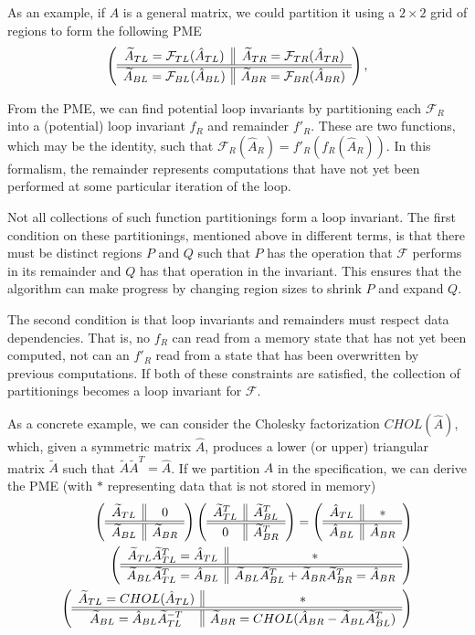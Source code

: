 \documentclass[12pt,letterpaper]{article}
\newcommand*{\opF}{\mathcal{F}}
\newcommand*{\opf}{f}
\begin{document}
As an example, if $A$ is a general matrix, we could partition it using a $2 \times 2$ grid of regions to form the following PME
\begin{equation*}
  \FlaTwoByTwo{\widetilde{A}_{TL} = \opF_{TL}(\hat{A}_{TL})}{\widetilde{A}_{TR} = \opF_{TR}(\hat{A}_{TR})}
  {\widetilde{A}_{BL} = \opF_{BL}(\hat{A}_{BL})}{\widetilde{A}_{BR} = \opF_{BR}(\hat{A}_{BR})},
\end{equation*}

From the PME, we can find potential loop invariants by partitioning each $\opF_R$ into a (potential) loop invariant $\opf_R$ and remainder $\opf'_R$.
These are two functions, which may be the identity, such that $\opF_R(\hat{A}_R) = \opf'_R(\opf_R(\hat{A}_R))$.
In this formalism, the remainder represents computations that have not yet been performed at some particular iteration of the loop.

Not all collections of such function partitionings form a loop invariant.
The first condition on these partitionings, mentioned above in different terms, is that there must be distinct regions $P$ and $Q$ such that $P$ has the operation that $\opF$ performs in its remainder and $Q$ has that operation in the invariant.
This ensures that the algorithm can make progress by changing region sizes to shrink $P$ and expand $Q$.

The second condition is that loop invariants and remainders must respect data dependencies.
That is, no $\opf_R$ can read from a memory state that has not yet been computed, not can an $\opf'_R$ read from a state that has been overwritten by previous computations.
If both of these constraints are satisfied, the collection of partitionings becomes a loop invariant for $\opF$.

As a concrete example, we can consider the Cholesky factorization $CHOL(\hat{A})$, which, given a symmetric matrix $\hat{A}$, produces a lower (or upper) triangular matrix $\widetilde{A}$ such that $\widetilde{A}\widetilde{A}^T = \hat{A}$.
If we partition $A$ in the specification, we can derive the PME (with $*$ representing data that is not stored in memory)
\begin{align*}
  \left( \begin{array}{c || c} \widetilde{A}_{TL} & 0 \\ \hline \hline \widetilde{A}_{BL} & \widetilde{A}_{BR} \end{array} \right)
  \left( \begin{array}{c || c} \widetilde{A}_{TL}^T & \widetilde{A}_{BL}^T \\ \hline \hline 0 & \widetilde{A}_{BR}^T \end{array} \right)
  = \left( \begin{array}{c || c} \hat{A}_{TL} & * \\ \hline \hline \hat{A}_{BL} & \hat{A}_{BR} \end{array} \right)\\
  \left( \begin{array}{c || c} \widetilde{A}_{TL}\widetilde{A}_{TL}^T = \hat{A}_{TL} & * \\ \hline \hline \widetilde{A}_{BL}\widetilde{A}_{TL}^T = \hat{A}_{BL} & \widetilde{A}_{BL}\widetilde{A}_{BL}^T + \widetilde{A}_{BR}\widetilde{A}_{BR}^T = \hat{A}_{BR} \end{array} \right)\\
  \left( \begin{array}{c || c} \widetilde{A}_{TL} = CHOL(\hat{A}_{TL}) & * \\ \hline \hline \widetilde{A}_{BL} = \hat{A}_{BL}\widetilde{A}_{TL}^{-T} & \widetilde{A}_{BR} = CHOL(\hat{A}_{BR} - \widetilde{A}_{BL}\widetilde{A}_{BL}^T) \end{array} \right)
\end{align*}
\end{document}
